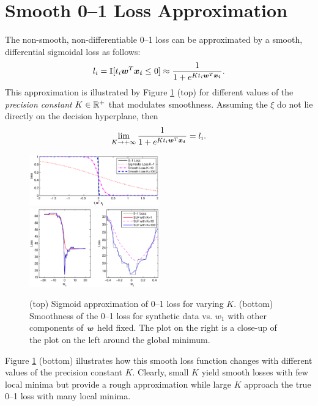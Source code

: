 \section{Smooth 0--1 Loss Approximation}
\label{cha:Smoothlossapprox}

The non-smooth, non-differentiable 0--1 loss can be
approximated by a smooth, differential sigmoidal loss as follows:
$$l_i = \mathbb{I} [t_i \boldsymbol{w}^T \boldsymbol{x_i} \leq 0] \approx \frac{1}{1 + e^{Kt_i \boldsymbol{w}^T \boldsymbol{x_i} }}.$$
This approximation is illustrated by Figure \ref{fig:sla.smooth} (top) for different
values of the \emph{precision constant} $K \in \mathbb{R}^+$ that modulates smoothness.
Assuming the $\xi$ do not lie
directly on the decision hyperplane, then 
$$\lim_{K \rightarrow +\infty} \frac{1}{1 + e^{Kt_i \boldsymbol{w}^T \boldsymbol{x_i} }} = l_i.$$

\begin{figure}[tp!]
\hspace{-3mm} \includegraphics[width=0.50\textwidth]{images/fig52_smooth.eps}
\vspace{-4mm} \hspace{-3mm} \includegraphics[width=0.50\textwidth]{images/fig53_smoothfunction.eps}
\vspace{-1mm}
\caption{ \footnotesize (top) Sigmoid approximation of 0--1 loss for varying
  $K$.  (bottom) Smoothness of the 0--1 loss for synthetic data vs. $w_1$ with
  other components of $\boldsymbol{w}$ held fixed.  The plot on the right is a
  close-up of the plot on the left around the global minimum.}
\label{fig:sla.smooth}
\vspace{-1mm}
\end{figure}

Figure
\ref{fig:sla.smooth} (bottom) illustrates how this smooth loss
function changes with different values of the precision constant $K$.
Clearly, small $K$ yield smooth losses with few local minima but
provide a rough approximation while large $K$ approach the true 0--1
loss with many local minima.

